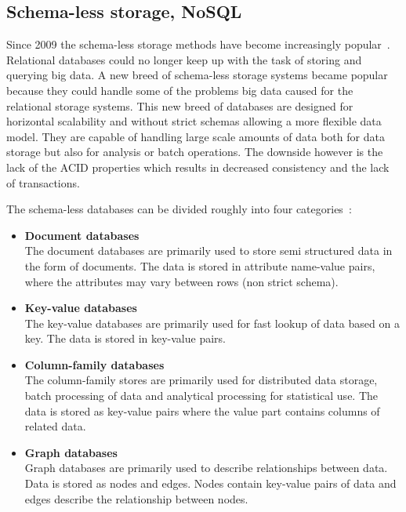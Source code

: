 \subsection{Schema-less storage, NoSQL}
\label{sec:nosql}
Since 2009 the schema-less storage methods have become increasingly popular~\cite{Stonebraker:2010:SDV:1721654.1721659}.
Relational databases could no longer keep up with the task of storing and querying big data.
A new breed of schema-less storage systems became popular because they could handle some of the problems big data caused for the relational storage systems.
This new breed of databases are designed for horizontal scalability and without strict schemas allowing a more flexible data model. 
They are capable of handling large scale amounts of data both for data storage but also for analysis or batch operations.
The downside however is the lack of the ACID properties which results in decreased consistency and the lack of transactions.

The schema-less databases can be divided roughly into four categories~\cite{Fowler:IntroNoSQL, Moniruzzaman:NoSQLDatabaseNewEraOfDatabasesForBigDataAnalysis}:

\begin{itemize}
	\item \textbf{Document databases} \\
	The document databases are primarily used to store semi structured data in the form of documents. The data is stored in attribute name-value pairs, where the attributes may vary between rows (non strict schema).
	
	\item \textbf{Key-value databases} \\
	The key-value databases are primarily used for fast lookup of data based on a key. The data is stored in key-value pairs.
	
	\item \textbf{Column-family databases} \\
	The column-family stores are primarily used for distributed data storage, batch processing of data and analytical processing for statistical use. The data is stored as key-value pairs where the value part contains columns of related data.
	
	\item \textbf{Graph databases} \\
	Graph databases are primarily used to describe relationships between data. Data is stored as nodes and edges. Nodes contain key-value pairs of data and edges describe the relationship between nodes.
\end{itemize}


